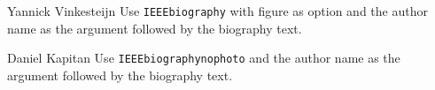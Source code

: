 \documentclass[
  journal,
]{IEEEtran}%
\theoremstyle{plain}
\theoremstyle{remark}
\begin{document}
\pagebreak[3]
\begin{IEEEbiography}{Yannick
Vinkesteijn}
Use \texttt{IEEEbiography} with figure as option and the author name as
the argument followed by the biography text.
\end{IEEEbiography}
\begin{IEEEbiography}{Daniel Kapitan}
Use \texttt{IEEEbiographynophoto} and the author name as the argument
followed by the biography text.
\end{IEEEbiography}
\end{document}
